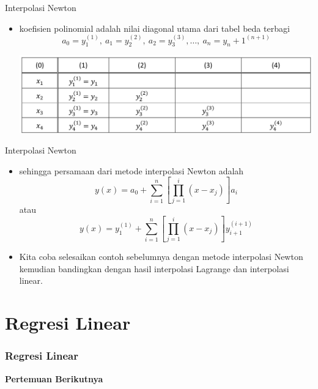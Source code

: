 \documentclass[pdflatex,compress]{beamer}
\begin{document}
\begin{frame}{Interpolasi Newton}
	\begin{itemize}
		\item koefisien polinomial adalah nilai diagonal utama dari tabel beda terbagi
		\begin{equation*}
			a_0 = y_1^{(1)},~a_1 = y_2^{(2)},~a_2 = y_3^{(3)},\dots,~a_n = y_n+1^{(n+1)}
		\end{equation*}
		\begin{center}
			\includegraphics[width=\linewidth]{img/img04}
		\end{center}
	\end{itemize}
\end{frame}

\begin{frame}{Interpolasi Newton}
	\begin{itemize}
		\item sehingga persamaan dari metode interpolasi Newton adalah
		\begin{equation*}
			y(x) = a_0 + \sum\limits_{i = 1}^{n} \left[ \prod\limits_{j = 1}^{i} (x - x_j) \right] a_i
		\end{equation*}
		atau
		\begin{equation*}
			y(x) = y_1^{(1)} + \sum\limits_{i = 1}^{n} \left[ \prod\limits_{j = 1}^{i} (x - x_j) \right] y_{i+1}^{(i+1)}
		\end{equation*}
		\item Kita coba selesaikan contoh sebelumnya dengan metode interpolasi Newton kemudian bandingkan dengan hasil interpolasi Lagrange dan interpolasi linear.
	\end{itemize}
\end{frame}

\section{Regresi Linear}

\begin{frame}
	\frametitle{Regresi Linear}
	\centering
	\textbf{Pertemuan Berikutnya}
\end{frame}
\end{document}
